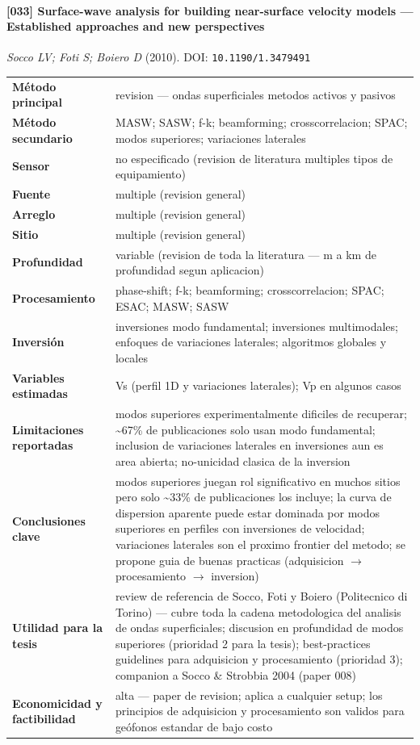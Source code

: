 \paragraph{[033] Surface-wave analysis for building near-surface velocity models --- Established approaches and new perspectives} \emph{Socco LV; Foti S; Boiero D} (2010).
{\scriptsize DOI: \texttt{10.1190/1.3479491}}

\begin{center}\scriptsize
\begin{tabularx}{\textwidth}{@{}>{\bfseries}p{3.3cm} X@{}}
\toprule
M\'etodo principal & revision --- ondas superficiales metodos activos y pasivos \\
M\'etodo secundario & MASW; SASW; f-k; beamforming; crosscorrelacion; SPAC; modos superiores; variaciones laterales \\
Sensor & no especificado (revision de literatura multiples tipos de equipamiento) \\
Fuente & multiple (revision general) \\
Arreglo & multiple (revision general) \\
Sitio & multiple (revision general) \\
Profundidad & variable (revision de toda la literatura --- m a km de profundidad segun aplicacion) \\
Procesamiento & phase-shift; f-k; beamforming; crosscorrelacion; SPAC; ESAC; MASW; SASW \\
Inversi\'on & inversiones modo fundamental; inversiones multimodales; enfoques de variaciones laterales; algoritmos globales y locales \\
Variables estimadas & Vs (perfil 1D y variaciones laterales); Vp en algunos casos \\
Limitaciones reportadas & modos superiores experimentalmente dificiles de recuperar; \textasciitilde{}67\% de publicaciones solo usan modo fundamental; inclusion de variaciones laterales en inversiones aun es area abierta; no-unicidad clasica de la inversion \\
Conclusiones clave & modos superiores juegan rol significativo en muchos sitios pero solo \textasciitilde{}33\% de publicaciones los incluye; la curva de dispersion aparente puede estar dominada por modos superiores en perfiles con inversiones de velocidad; variaciones laterales son el proximo frontier del metodo; se propone guia de buenas practicas (adquisicion $\rightarrow$ procesamiento $\rightarrow$ inversion) \\
Utilidad para la tesis & review de referencia de Socco, Foti y Boiero (Politecnico di Torino) --- cubre toda la cadena metodologica del analisis de ondas superficiales; discusion en profundidad de modos superiores (prioridad 2 para la tesis); best-practices guidelines para adquisicion y procesamiento (prioridad 3); companion a Socco \& Strobbia 2004 (paper 008) \\
Economicidad y factibilidad & alta --- paper de revision; aplica a cualquier setup; los principios de adquisicion y procesamiento son validos para geófonos estandar de bajo costo \\
\bottomrule
\end{tabularx}
\end{center}


